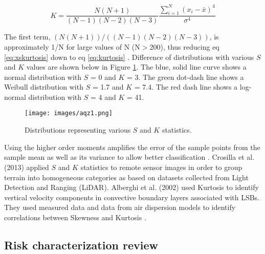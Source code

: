 \begin{equation}
\label{eq:xskurtosis}
K = \frac{N(N+1)}{(N-1)(N-2)(N-3)} \frac{\sum_{i=1}^{N}\left (x_{i}-\bar{x} \right )^{4}}{\sigma^{4}}
\end{equation}

The first term, $(N(N+1))/((N-1)(N-2)(N-3))$, is approximately 1/N for large values of N (N$>$200), thus reducing eq \ref{eq:xskurtosis} down to eq \ref{eq:kurtosis} \citep{Cox2010}.  Difference of distributions with various $S$ and $K$ values are shown below in Figure \ref{fig:SKcurves}.  The blue, solid line curve shows a normal distribution with $S$ = 0 and $K$ = 3. The green dot-dash line shows a Weibull distribution with $S$ = 1.7 and $K$ = 7.4.  The red dash line shows a log-normal distribution with $S$ = 4 and $K$ = 41. 
%
\begin{figure}
\texttt{[image: images/aqz1.png]} 
\caption{Distributions representing various $S$ and $K$ statistics.}
\label{fig:SKcurves}
\end{figure}
%
Using the higher order moments amplifies the error of the sample points from the sample mean as well as its variance to allow better classification \citep{Seo2011}.  Crosilla et al. (2013) applied $S$ and $K$ statistics to remote sensor images in order to group terrain into homogeneous categories as based on datasets collected from Light Detection and Ranging (LiDAR).  Alberghi et al. (2002) used Kurtosis to identify vertical velocity components in convective boundary layers associated with LSBs.  They used measured data and data from air dispersion models to identify correlations between Skewness and Kurtosis \citep{Alberghi2002}.

\subsection{Risk characterization review}


